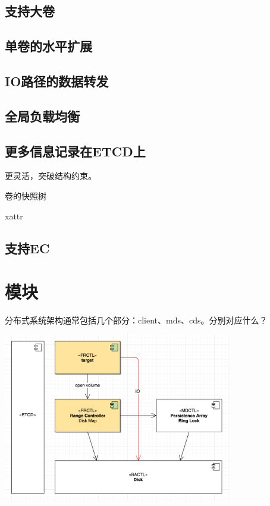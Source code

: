 \subsection{支持大卷}

\subsection{单卷的水平扩展}

\subsection{IO路径的数据转发}

\subsection{全局负载均衡}

\subsection{更多信息记录在ETCD上}

更灵活，突破结构约束。

\begin{enumbox}
\item 卷的快照树
\item xattr
\end{enumbox}

\subsection{支持EC}

\section{模块}

分布式系统架构通常包括几个部分：client、mds、cds。分别对应什么？
\begin{center}
\includegraphics[width=10cm]{../imgs/arch/modules.png}
\end{center}

